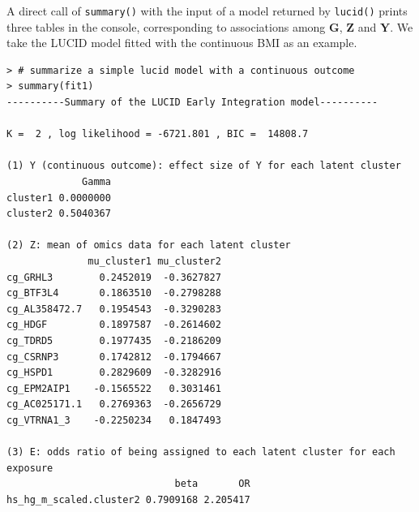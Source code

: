 A direct call of \texttt{summary()} with the input of a model returned by
\texttt{lucid()} prints three tables in the console, corresponding to
associations among \(\boldsymbol{\mathbf{G}}\), \(\boldsymbol{\mathbf{Z}}\)
and \(\boldsymbol{\mathbf{Y}}\). We take the LUCID model fitted with the
continuous BMI as an example.

\begin{verbatim}
> # summarize a simple lucid model with a continuous outcome
> summary(fit1)
----------Summary of the LUCID Early Integration model---------- 
 
K =  2 , log likelihood = -6721.801 , BIC =  14808.7 
 
(1) Y (continuous outcome): effect size of Y for each latent cluster
             Gamma
cluster1 0.0000000
cluster2 0.5040367

(2) Z: mean of omics data for each latent cluster 
              mu_cluster1 mu_cluster2
cg_GRHL3        0.2452019  -0.3627827
cg_BTF3L4       0.1863510  -0.2798288
cg_AL358472.7   0.1954543  -0.3290283
cg_HDGF         0.1897587  -0.2614602
cg_TDRD5        0.1977435  -0.2186209
cg_CSRNP3       0.1742812  -0.1794667
cg_HSPD1        0.2829609  -0.3282916
cg_EPM2AIP1    -0.1565522   0.3031461
cg_AC025171.1   0.2769363  -0.2656729
cg_VTRNA1_3    -0.2250234   0.1847493

(3) E: odds ratio of being assigned to each latent cluster for each exposure 
                             beta       OR
hs_hg_m_scaled.cluster2 0.7909168 2.205417
\end{verbatim}

